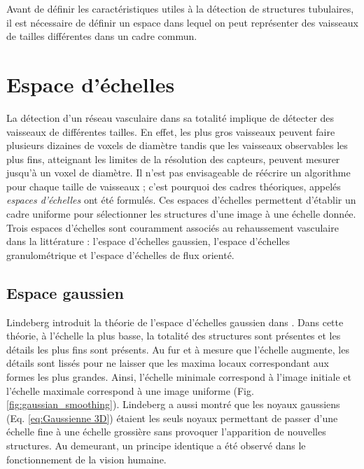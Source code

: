   Avant de définir les caractéristiques utiles à la détection de structures tubulaires, il est nécessaire de définir un espace dans lequel on peut représenter des vaisseaux de tailles différentes dans un cadre commun.

  \section{Espace d'échelles}
  \label{sec:EA:rehaussement:echelle}
  
  La détection d'un réseau vasculaire dans sa totalité implique de détecter des vaisseaux de différentes tailles. En effet, les plus gros vaisseaux peuvent faire plusieurs dizaines de voxels de diamètre tandis que les vaisseaux observables les plus fins, atteignant les limites de la résolution des capteurs, peuvent  mesurer jusqu'à un voxel de diamètre. Il n'est pas envisageable de réécrire un algorithme pour chaque taille de vaisseaux ; c'est pourquoi des cadres théoriques, appelés \emph{espaces d'échelles} ont été formulés. Ces espaces d'échelles permettent d'établir un cadre uniforme pour sélectionner les structures d'une image à une échelle donnée. Trois espaces d'échelles sont couramment associés au rehaussement vasculaire dans la littérature : l'espace d'échelles gaussien, l'espace d'échelles granulométrique et l'espace d'échelles de flux orienté.
  
  \subsection{Espace gaussien}
  \label{sec:EA:rehaussement:echelle:gaussien}
  Lindeberg introduit la théorie de l'espace d'échelles gaussien dans \cite{Lindeberg1994_scale}. Dans cette théorie, à l'échelle la plus basse, la totalité des structures sont présentes et les détails les plus fins sont présents. Au fur et à mesure que l'échelle augmente, les détails sont lissés pour ne laisser que les maxima locaux correspondant aux formes les plus grandes. Ainsi, l'échelle minimale correspond à l'image initiale et l'échelle maximale correspond à une image uniforme (Fig. \ref{fig:gaussian_smoothing}). Lindeberg a aussi montré que les noyaux gaussiens (Eq. \ref{eq:Gaussienne 3D}) étaient les seuls noyaux permettant de passer d'une échelle fine à une échelle grossière sans provoquer l'apparition de nouvelles structures. Au demeurant, un principe identique a été observé dans le fonctionnement de la vision humaine.
  
